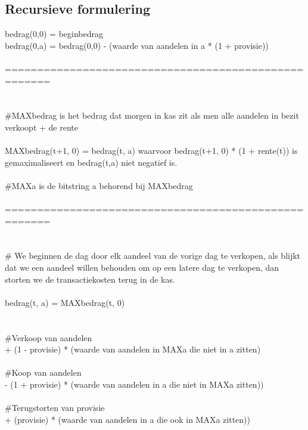 \documentclass{article}
\begin{document}
\subsection{Recursieve formulering}
bedrag(0,0) = beginbedrag\\
bedrag(0,a) = bedrag(0,0) - (waarde van aandelen in a * (1 + provisie)) \\\\
=====================================================\\\\
\\ \#MAXbedrag is het bedrag dat morgen in kas zit als men alle aandelen in bezit verkoopt + de rente\\\\
MAXbedrag(t+1, 0) = bedrag(t, a) waarvoor bedrag(t+1, 0) * (1 + rente(t)) is gemaximaliseert en bedrag(t,a) niet negatief is.\\
\\ \#MAXa is de bitstring a behorend bij MAXbedrag\\\\ 
=====================================================\\\\
\\ \# We beginnen de dag door elk aandeel van de vorige dag te verkopen, als blijkt dat we een aandeel willen behouden om op een latere dag te verkopen, dan storten we de transactiekosten terug in de kas.\\\\
bedrag(t, a) = MAXbedrag(t, 0)\\\\
\\ \#Verkoop van aandelen\\
+ (1 - provisie) * (waarde van aandelen in MAXa die niet in a zitten)\\
\\ \#Koop van aandelen\\
- (1 + provisie) * (waarde van aandelen in a die niet in MAXa zitten))\\
\\ \#Terugstorten van provisie \\ 
+ (provisie) * (waarde van aandelen in a die ook in MAXa zitten))
\\\\
\\\\
\newpage
\end{document}
